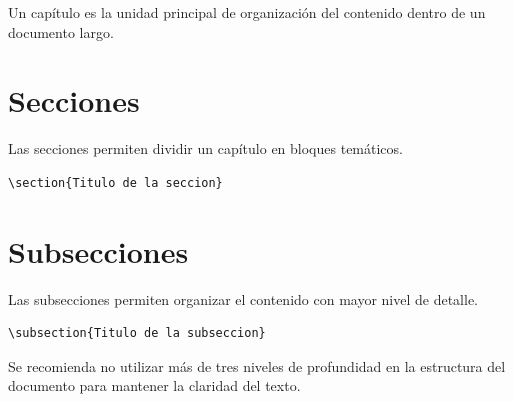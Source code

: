 \begin{definitionbox}[Capítulo]
Un capítulo es la unidad principal de organización
del contenido dentro de un documento largo.
\end{definitionbox}




\section{Secciones}

Las secciones permiten dividir un capítulo en bloques
temáticos.

\begin{lstlisting}[caption={Creación de una sección},label={code:section}]
\section{Titulo de la seccion}
\end{lstlisting}





\section{Subsecciones}

Las subsecciones permiten organizar el contenido con
mayor nivel de detalle.

\begin{lstlisting}[caption={Creación de una subsección},label={code:subsection}]
\subsection{Titulo de la subseccion}
\end{lstlisting}




\begin{notebox}
Se recomienda no utilizar más de tres niveles
de profundidad en la estructura del documento
para mantener la claridad del texto.
\end{notebox}



